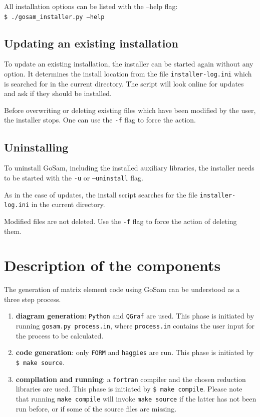 \documentclass[11pt,a4paper]{refrep}
\newcommand{\gosamversion}{{2{.}0}}
\newcommand{\gosam}{{\sc GoSam}\xspace}
\newcommand{\gosamv}[1][\gosamversion]{{\sc GoSam}\xspace}
\newcommand{\qgraf}{{\tt QGraf}\xspace}
\newcommand{\form}{{\tt FORM}\xspace}
\newcommand{\python}{{\tt Python}\xspace}
\newcommand{\haggies}{{\tt haggies}\xspace}
\begin{document}
All installation options can be listed with the --help flag:\\
{\tt \$ ./gosam\_installer.py --help}


\subsection{Updating an existing installation}

To update an existing installation, the installer can be started again without
any option. It determines the install location from the file {\tt installer-log.ini}
which is searched for in the current directory. The script will look 
online for updates and ask if they should be installed.

Before overwriting or deleting existing files which have been modified by the user, 
the installer stops. One can use the {\tt -f} flag to force the action.

\subsection{Uninstalling}
To uninstall \gosam, including the installed auxiliary libraries,
the installer needs to be started with the {\tt -u} or {\tt --uninstall} flag.

As in the case of updates, the install script searches for the file 
{\tt installer-log.ini} in the current directory.

Modified files are not deleted. Use the {\tt -f} flag to force the action of
deleting them.




\section{Description of the components}


The generation of matrix element code using \gosamv can be understood
as a three step process. 
\begin{enumerate}
\item  {\bf diagram generation}: \python
and \qgraf are used. This phase is initiated by
running \texttt{gosam.py process.in}, where {\tt process.in} contains the 
user input for the process to be calculated.
\item {\bf code generation}: only \form and \haggies are run.
This phase is initiated by  \texttt{\$ make source}.
\item {\bf compilation and running}: 
a {\tt fortran} compiler and the chosen reduction libraries are used.
This phase is initiated
by  \texttt{\$ make compile}. Please note that running
\texttt{make compile} will invoke \texttt{make source} if the latter
has not been run  before, or if some of the source files are missing.
\end{enumerate}
\end{document}
